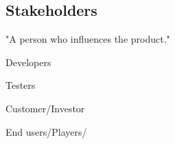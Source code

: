 \subsection{Stakeholders}
"A person who influences the product."

Developers

Testers

Customer/Investor

End users/Players/
